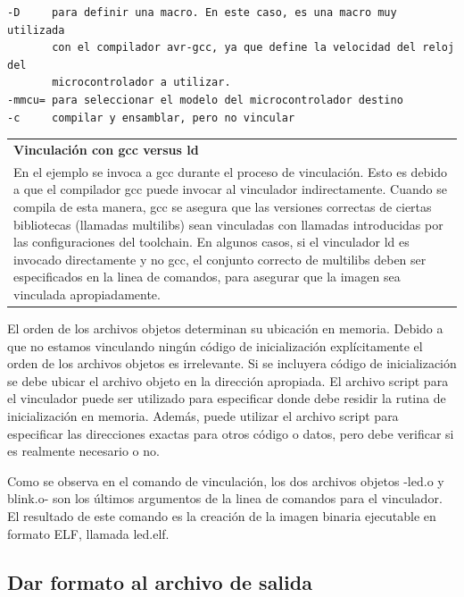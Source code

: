 \documentclass[output=paper, 
colorlinks,
citecolor=brown,
newtxmath
]{langscibook}
\begin{document}
\begin{small}
\begin{verbatim}
-D     para definir una macro. En este caso, es una macro muy utilizada
       con el compilador avr-gcc, ya que define la velocidad del reloj del 
       microcontrolador a utilizar.
-mmcu= para seleccionar el modelo del microcontrolador destino 
-c     compilar y ensamblar, pero no vincular
\end{verbatim}
\end{small}


\begin{center}
\begin{tabularx}{\textwidth}{|X|}
\hline
\rowcolor{lightgray}
\textbf{Vinculación con gcc versus ld}\\
En el ejemplo se invoca  a gcc durante el proceso de vinculación.
Esto es debido a que el compilador gcc puede invocar al vinculador 
indirectamente.
Cuando se compila de esta manera, gcc se asegura que las versiones correctas
de ciertas bibliotecas (llamadas multilibs) sean vinculadas con llamadas
introducidas por las configuraciones del toolchain. En algunos casos, 
si el vinculador ld es invocado directamente y no gcc, el conjunto correcto de multilibs deben ser especificados en la linea de comandos, 
para asegurar que la imagen sea vinculada apropiadamente.\\
\hline
\end{tabularx}
\end{center}


El orden de los archivos objetos determinan su ubicación en memoria.
Debido a que no estamos vinculando ningún código de inicialización explícitamente
el orden de los archivos objetos es irrelevante.
Si se incluyera código de inicialización se debe ubicar el archivo objeto 
en la dirección apropiada. El archivo script para el vinculador puede ser 
utilizado para especificar donde debe residir la rutina de inicialización
en memoria. Además, puede utilizar el archivo script para 
especificar las direcciones exactas para otros código o datos, pero debe
verificar si es realmente necesario o no.

Como se observa en el comando de vinculación, los dos archivos objetos -led.o y blink.o-
son los últimos argumentos de la linea de comandos para el vinculador.
El resultado de este comando es la creación de la imagen binaria ejecutable
en formato ELF, llamada led.elf.

\subsection {Dar formato al archivo de salida}
\end{document}
